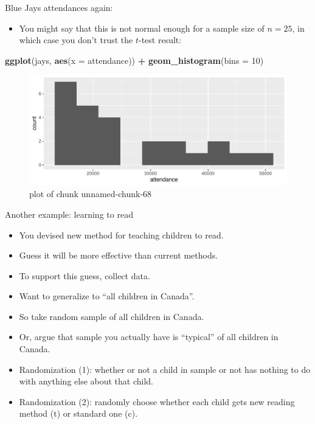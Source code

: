 \documentclass[
  ignorenonframetext,
]{beamer}
\newenvironment{Shaded}{\begin{snugshade}}{\end{snugshade}}
\newcommand{\DataTypeTok}[1]{\textcolor[rgb]{0.13,0.29,0.53}{#1}}
\newcommand{\DecValTok}[1]{\textcolor[rgb]{0.00,0.00,0.81}{#1}}
\newcommand{\KeywordTok}[1]{\textcolor[rgb]{0.13,0.29,0.53}{\textbf{#1}}}
\newcommand{\NormalTok}[1]{#1}
\newcommand{\OperatorTok}[1]{\textcolor[rgb]{0.81,0.36,0.00}{\textbf{#1}}}
\newcommand{\StringTok}[1]{\textcolor[rgb]{0.31,0.60,0.02}{#1}}
\providecommand{\tightlist}{%
  \setlength{\itemsep}{0pt}\setlength{\parskip}{0pt}}
\begin{document}
\begin{frame}[fragile]{Blue Jays attendances again:}
\protect\hypertarget{blue-jays-attendances-again}{}

\begin{itemize}
\tightlist
\item
  You might say that this is not normal enough for a sample size of
  \(n = 25\), in which case you don't trust the \(t\)-test result:
\end{itemize}

\begin{Shaded}
\begin{Highlighting}[]
\KeywordTok{ggplot}\NormalTok{(jays, }\KeywordTok{aes}\NormalTok{(}\DataTypeTok{x =}\NormalTok{ attendance)) }\OperatorTok{+}\StringTok{ }\KeywordTok{geom_histogram}\NormalTok{(}\DataTypeTok{bins =} \DecValTok{10}\NormalTok{)}
\end{Highlighting}
\end{Shaded}

\begin{figure}
\centering
\includegraphics{figure/unnamed-chunk-68-1.pdf}
\caption{plot of chunk unnamed-chunk-68}
\end{figure}

\end{frame}

\begin{frame}{Another example: learning to read}
\protect\hypertarget{another-example-learning-to-read}{}

\begin{itemize}
\tightlist
\item
  You devised new method for teaching children to read.
\item
  Guess it will be more effective than current methods.
\item
  To support this guess, collect data.
\item
  Want to generalize to ``all children in Canada''.
\item
  So take random sample of all children in Canada.
\item
  Or, argue that sample you actually have is ``typical'' of all children
  in Canada.
\item
  Randomization (1): whether or not a child in sample or not has nothing
  to do with anything else about that child.
\item
  Randomization (2): randomly choose whether each child gets new reading
  method (t) or standard one (c).
\end{itemize}

\end{frame}
\end{document}
